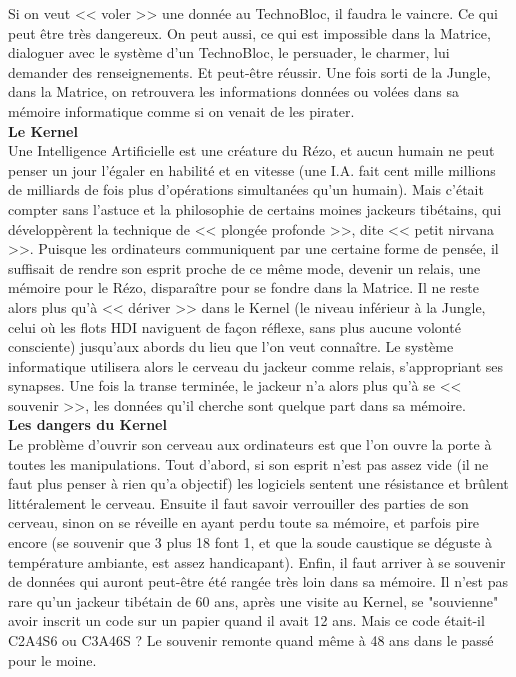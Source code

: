 \documentclass[11pt,twoside,a4paper]{article}
\begin{document}
\begin{multicols}{3}
{Si on veut << voler >> une donn{\'e}e au TechnoBloc, il faudra le vaincre. Ce qui peut {\^e}tre tr{\`e}s dangereux. On peut aussi, ce qui est impossible dans la Matrice, dialoguer avec le syst{\`e}me d'un TechnoBloc, le persuader, le charmer, lui demander des renseignements. Et peut-{\^e}tre r{\'e}ussir. Une fois sorti de la Jungle, dans la Matrice, on retrouvera les informations donn{\'e}es ou vol{\'e}es dans sa m{\'e}moire informatique comme si on venait de les pirater.~\\

\textbf{\Large Le Kernel}~\\

Une Intelligence Artificielle est une cr{\'e}ature du R{\'e}zo, et aucun humain ne peut penser un jour l'{\'e}galer en habilit{\'e} et en vitesse (une I.A. fait cent mille millions de milliards de fois plus d'op{\'e}rations simultan{\'e}es qu'un humain). Mais c'{\'e}tait compter sans l'astuce et la philosophie de certains moines jackeurs tib{\'e}tains, qui d{\'e}velopp{\`e}rent la technique de << plong{\'e}e profonde >>, dite << petit nirvana >>. Puisque les ordinateurs communiquent par une certaine forme de pens{\'e}e, il suffisait de rendre son esprit proche de ce m{\^e}me mode, devenir un relais, une m{\'e}moire pour le R{\'e}zo, dispara{\^i}tre pour se fondre dans la Matrice. Il ne reste alors plus qu'{\`a} << d{\'e}river >> dans le Kernel (le niveau inf{\'e}rieur {\`a} la Jungle, celui o{\`u} les flots HDI naviguent de fa\c{c}on r{\'e}flexe, sans plus aucune volont{\'e} consciente) jusqu'aux abords du lieu que l'on veut conna{\^i}tre. Le syst{\`e}me informatique utilisera alors le cerveau du jackeur comme relais, s'appropriant ses synapses. Une fois la transe termin{\'e}e, le jackeur n'a alors plus qu'{\`a} se << souvenir >>, les donn{\'e}es qu'il cherche sont quelque part dans sa m{\'e}moire.~\\

\textbf{\large Les dangers du Kernel}~\\

Le probl{\`e}me d'ouvrir son cerveau aux ordinateurs est que l'on ouvre la porte {\`a} toutes les manipulations. Tout d'abord, si son esprit n'est pas assez vide (il ne faut plus penser {\`a} rien qu'a objectif) les logiciels sentent une r{\'e}sistance et br{\^u}lent litt{\'e}ralement le cerveau. Ensuite il faut savoir verrouiller des parties de son cerveau, sinon on se r{\'e}veille en ayant perdu toute sa m{\'e}moire, et parfois pire encore (se souvenir que 3 plus 18 font 1, et que la soude caustique se d{\'e}guste {\`a} temp{\'e}rature ambiante, est assez handicapant). Enfin, il faut arriver {\`a} se souvenir de donn{\'e}es qui auront peut-{\^e}tre {\'e}t{\'e} rang{\'e}e tr{\`e}s loin dans sa m{\'e}moire. Il n'est pas rare qu'un jackeur tib{\'e}tain de 60 ans, apr{\`e}s une visite au Kernel, se "souvienne" avoir inscrit un code sur un papier quand il avait 12 ans. Mais ce code {\'e}tait-il C2A4S6 ou C3A46S ? Le souvenir remonte quand m{\^e}me {\`a} 48 ans dans le pass{\'e} pour le moine.~\\

}
\end{multicols}
\end{document}
